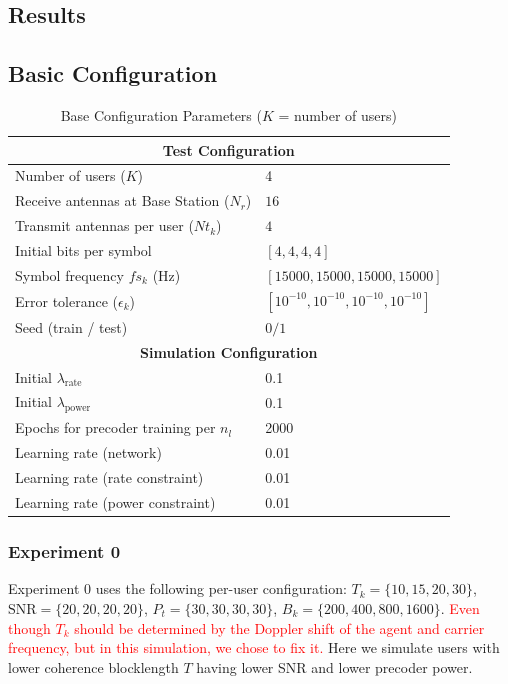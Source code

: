 \documentclass[a4paper, 12pt, onecolumn, journal, twoside, draftclsnofoot]{IEEEtran}
\begin{document}
\subsection{Results}


\subsection*{Basic Configuration}

\begin{table}[H]
\centering
\caption{Base Configuration Parameters ($K$ = number of users)}
\begin{tabular}{ll}
\toprule
\multicolumn{2}{c}{\textbf{Test Configuration}} \\
\midrule
Number of users ($K$) & 4 \\
Receive antennas  at Base Station ($N_r$) & $16$ \\
Transmit antennas per user ($Nt_{k}$) & $4$ \\
Initial bits per symbol & $[4,4,4,4]$ \\
Symbol frequency $fs_k$ (Hz) & $[15000,15000,15000,15000]$ \\
Error tolerance ($\epsilon_k$) & $[10^{-10},10^{-10},10^{-10},10^{-10}]$ \\
Seed (train / test) & $0 / 1$ \\
\midrule
\multicolumn{2}{c}{\textbf{Simulation Configuration}} \\
\midrule
Initial $\lambda_{\text{rate}}$ & 0.1 \\
Initial $\lambda_{\text{power}}$ & 0.1 \\
Epochs for precoder training per $n_l$ & 2000 \\
Learning rate (network) & 0.01 \\
Learning rate (rate constraint) & 0.01 \\
Learning rate (power constraint) & 0.01 \\
\bottomrule
\end{tabular}
\end{table}

\subsubsection*{\textbf{Experiment 0}}
Experiment 0 uses the following per-user configuration:
$T_k = \{10,15,20,30\}$, $\mathrm{SNR}=\{20,20,20,20\}$, $P_t=\{30,30,30,30\}$, $B_k = \{200,400,800,1600\}$.  \textcolor{red}{Even though $T_k$ should be determined by the Doppler shift of the agent and carrier frequency, but in this simulation, we chose to fix it.}  Here we simulate users with lower coherence blocklength $T$ having lower SNR and lower precoder power.
\end{document}
